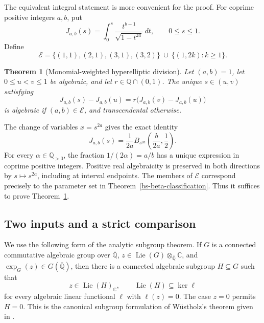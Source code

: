 \documentclass[11pt,a4paper]{article}
\newtheorem{theorem}{Theorem}[section]
\theoremstyle{definition}
\theoremstyle{remark}
\numberwithin{equation}{section}
\newcommand{\Qbar}{\overline{\mathbb Q}}
\begin{document}
The equivalent integral statement is more convenient for the proof.
For coprime positive integers $a,b$, put
\[
 J_{a,b}(s)=\int_0^s\frac{t^{b-1}}{\sqrt{1-t^{2a}}}\,dt,
 \qquad 0\le s\le1.
\]
Define
\[
 \mathcal E=
 \{(1,1),(2,1),(3,1),(3,2)\}
 \ \cup\ \{(1,2k):k\ge1\}.
\]

\begin{theorem}[Monomial-weighted hyperelliptic division]
\label{bs-integral-classification}
Let $(a,b)=1$, let $0\le u<v\le1$ be algebraic, and let
$r\in\mathbb Q\cap(0,1)$.  The unique $s\in(u,v)$ satisfying
\begin{equation}
 J_{a,b}(s)-J_{a,b}(u)
 =r\bigl(J_{a,b}(v)-J_{a,b}(u)\bigr)
 \label{bs-division-equation}
\end{equation}
is algebraic if $(a,b)\in\mathcal E$, and transcendental otherwise.
\end{theorem}

The change of variables $x=s^{2a}$ gives the exact identity
\begin{equation}
 J_{a,b}(s)=\frac{1}{2a}
 B_{s^{2a}}\!\left(\frac{b}{2a},\frac12\right).
 \label{bs-beta-change}
\end{equation}
For every $\alpha\in\mathbb Q_{>0}$, the fraction
$1/(2\alpha)=a/b$ has a unique expression in coprime positive integers.
Positive real algebraicity is preserved in both directions by
$s\mapsto s^{2a}$, including at interval endpoints.  The members of
$\mathcal E$ correspond precisely to the parameter set in
Theorem~\ref{bs-beta-classification}.  Thus it suffices to prove
Theorem~\ref{bs-integral-classification}.

\subsection{Two inputs and a strict comparison}

We use the following form of the analytic subgroup theorem.  If $G$ is
a connected commutative algebraic group over $\Qbar$, $z\in
\operatorname{Lie}(G)\otimes_{\Qbar}\mathbb C$, and
$\exp_G(z)\in G(\Qbar)$, then there is a connected algebraic subgroup
$H\subseteq G$ such that
\[
 z\in\operatorname{Lie}(H)_{\mathbb C},
 \qquad
 \operatorname{Lie}(H)\subseteq\ker\ell
\]
for every algebraic linear functional $\ell$ with $\ell(z)=0$.
The case $z=0$ permits $H=0$.  This is the canonical subgroup formulation
of W\"ustholz's theorem given in
\cite[Theorem~6.2]{lm-HuberWustholz}.
\end{document}
